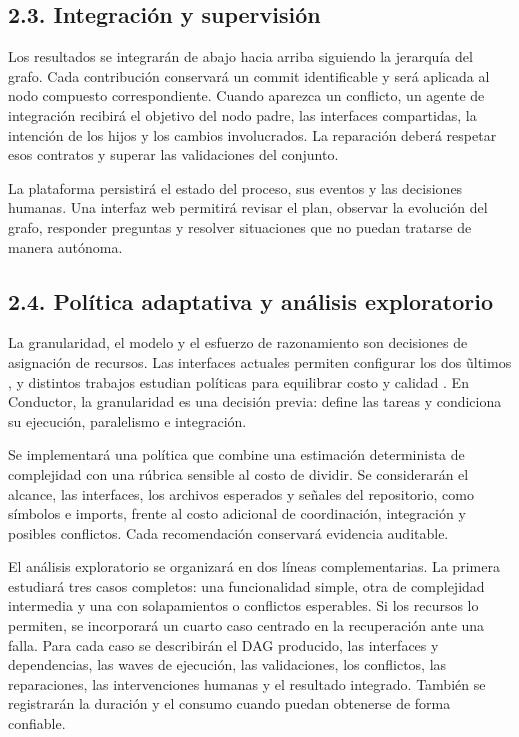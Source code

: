 \documentclass[11pt,a4paper]{article}
\begin{document}
\subsection*{2.3. Integraci\'on y supervisi\'on}

Los resultados se integrar\'an de abajo hacia arriba siguiendo la jerarqu\'ia del
grafo. Cada contribuci\'on conservar\'a un commit identificable y ser\'a aplicada
al nodo compuesto correspondiente. Cuando aparezca un conflicto, un agente de
integraci\'on recibir\'a el objetivo del nodo padre, las interfaces compartidas,
la intenci\'on de los hijos y los cambios involucrados. La reparaci\'on deber\'a
respetar esos contratos y superar las validaciones del conjunto.

La plataforma persistir\'a el estado del proceso, sus eventos y las decisiones
humanas. Una interfaz web permitir\'a revisar el plan, observar la evoluci\'on del
grafo, responder preguntas y resolver situaciones que no puedan tratarse de
manera aut\'onoma.

\subsection*{2.4. Pol\'itica adaptativa y an\'alisis exploratorio}

La granularidad, el modelo y el esfuerzo de razonamiento son decisiones de
asignaci\'on de recursos. Las interfaces actuales permiten
configurar los dos \~ultimos \cite{openai2025reasoning,anthropic2026adaptive}, y
distintos trabajos estudian pol\'iticas para equilibrar costo y calidad
\cite{chen2023frugalgpt,ong2025routellm}. En Conductor, la granularidad es una
decisi\'on previa: define las tareas y condiciona su ejecuci\'on, paralelismo e
integraci\'on.

Se implementar\'a una pol\'itica que combine una estimaci\'on determinista de
complejidad con una r\'ubrica sensible al costo de dividir. Se considerar\'an el
alcance, las interfaces, los archivos esperados y se\~nales del repositorio,
como s\'imbolos e imports, frente al costo adicional de coordinaci\'on,
integraci\'on y posibles conflictos. Cada recomendaci\'on conservar\'a evidencia
auditable.

El an\'alisis exploratorio se organizar\'a en dos l\'ineas complementarias. La
primera estudiar\'a tres casos completos: una funcionalidad simple, otra de
complejidad intermedia y una con solapamientos
o conflictos esperables. Si los recursos lo permiten, se incorporar\'a un cuarto
caso centrado en la recuperaci\'on ante una falla. Para cada caso se describir\'an
el DAG producido, las interfaces y dependencias, las waves de ejecuci\'on, las
validaciones, los conflictos, las reparaciones, las intervenciones humanas y el
resultado integrado. Tambi\'en se registrar\'an la duraci\'on y el consumo cuando
puedan obtenerse de forma confiable.
\end{document}

